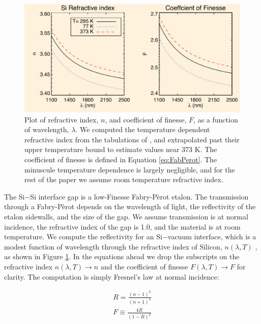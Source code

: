 \documentclass[osajnl,preprint,showpacs,superscriptaddress,12pt]{revtex4-1} %
\begin{document}
\begin{figure}[htbp]
\centerline{\includegraphics[width=0.95\columnwidth]{figs/SiIndexAOmgsFinesseFig.pdf}}
\caption{Plot of refractive index, $n$, and coefficient of finesse, $F$, as a function of wavelength, $\lambda$.\label{figSiIndexFinesse} We computed the temperature dependent refractive index from the tabulations of \cite{2006SPIE.6273E..77F}, and extrapolated past their upper temperature bound to estimate values near 373 K.  The coefficient of finesse is defined in Equation \ref{eq:FabPerot}.  The minuscule temperature dependence is largely negligible, and for the rest of the paper we assume room temperature refractive index.}
\end{figure}

The Si$-$Si interface gap is a low-Finesse Fabry-P\`{e}rot etalon\cite{2007fuph.book.....S}.  The transmission through a Fabry-P\`{e}rot depends on the wavelength of light, the reflectivity of the etalon sidewalls, and the size of the gap.  We assume transmission is at normal incidence, the refractive index of the gap is 1.0, and the material is at room temperature.  We compute the reflectivity for an Si$-$vacuum interface, which is a modest function of wavelength through the refractive index of Silicon, $n(\lambda, T)$ \cite{2006SPIE.6273E..77F}, as shown in Figure \ref{figSiIndexFinesse}.  In the equations ahead we drop the subscripts on the refractive index $n(\lambda, T) \rightarrow n$ and the coefficient of finesse $F(\lambda, T) \rightarrow F$ for clarity.  The computation is simply Fresnel's law at normal incidence:

\begin{eqnarray}
R = \frac{(n-1)^2}{(n+1)^2} \\
F \equiv \frac{4R}{(1-R)^2}
\end{eqnarray}
\end{document}
